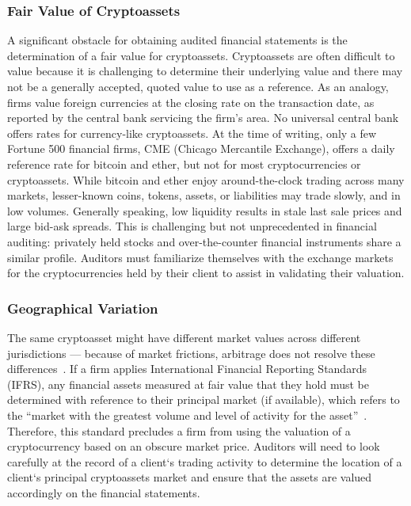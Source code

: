 \subsubsection{Fair Value of Cryptoassets}
A significant obstacle for obtaining audited financial statements is the determination of a fair value for cryptoassets. Cryptoassets are often difficult to value because it is challenging to determine their underlying value and there may not be a generally accepted, quoted value to use as a reference. As an analogy, firms value foreign currencies at the closing rate on the transaction date, as reported by the central bank servicing the firm's area. No universal central bank offers rates for currency-like cryptoassets. At the time of writing, only a few Fortune 500 financial firms, \eg CME (Chicago Mercantile Exchange), offers a daily reference rate for bitcoin and ether, but not for most cryptocurrencies or cryptoassets.
While bitcoin and ether enjoy around-the-clock trading across many markets, lesser-known coins, tokens, assets, or liabilities may trade slowly, and in low volumes. Generally speaking, low liquidity results in stale last sale prices and large bid-ask spreads. This is challenging but not unprecedented in financial auditing: privately held stocks and over-the-counter financial instruments share a similar profile. Auditors must familiarize themselves with the exchange markets for the cryptocurrencies held by their client to assist in validating their valuation.

\subsubsection{Geographical Variation}
The same cryptoasset might have different market values across different jurisdictions — because of market frictions, arbitrage does not resolve these differences~\cite{kroeger2017law}. If a firm applies International Financial Reporting Standards (IFRS), any financial assets measured at fair value that they hold must be determined with reference to their principal market (if available), which refers to the ``market with the greatest volume and level of activity for the asset''~\cite{ifrs13fairvalue}. Therefore, this standard precludes a firm from using the valuation of a cryptocurrency based on an obscure market price. Auditors will need to look carefully at the record of a client`s trading activity to determine the location of a client`s principal cryptoassets market and ensure that the assets are valued accordingly on the financial statements.



